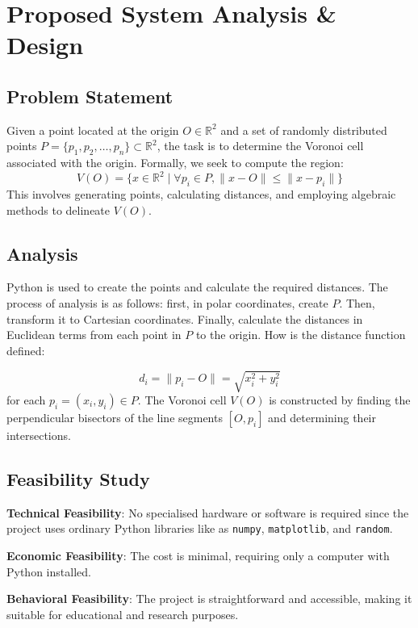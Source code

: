 \documentclass[12pt,a4paper]{report}
\begin{document}
\chapter{Proposed System Analysis \& Design}

\section{Problem Statement}

Given a point located at the origin \( O \in \mathbb{R}^2 \) and a set of randomly distributed points \( P = \{p_1, p_2, \ldots, p_n\} \subset \mathbb{R}^2 \), the task is to determine the Voronoi cell associated with the origin. Formally, we seek to compute the region:
\[
V(O) = \{ x \in \mathbb{R}^2 \mid \forall p_i \in P, \|x - O\| \leq \|x - p_i\| \}
\]
This involves generating points, calculating distances, and employing algebraic methods to delineate \( V(O) \).

\section{Analysis}

Python is used to create the points and calculate the required distances. The process of analysis is as follows: first, in polar coordinates, create \( P \). Then, transform it to Cartesian coordinates. Finally, calculate the distances in Euclidean terms from each point in \( P \) to the origin. How is the distance function defined:

\[
d_i = \|p_i - O\| = \sqrt{x_i^2 + y_i^2}
\]
for each \( p_i = (x_i, y_i) \in P \). The Voronoi cell \( V(O) \) is constructed by finding the perpendicular bisectors of the line segments \( [O, p_i] \) and determining their intersections.

\section{Feasibility Study}

\textbf{Technical Feasibility}: No specialised hardware or software is required since the project uses ordinary Python libraries like as \texttt{numpy}, \texttt{matplotlib}, and \texttt{random}.

\textbf{Economic Feasibility}: The cost is minimal, requiring only a computer with Python installed.

\textbf{Behavioral Feasibility}: The project is straightforward and accessible, making it suitable for educational and research purposes.
\end{document}
